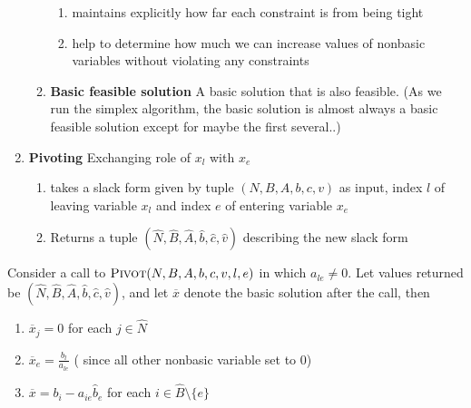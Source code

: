 \documentclass[11pt]{article}
\begin{document}
\begin{defn*}
\begin{enumerate}
\begin{enumerate}
            \begin{enumerate}
                \item maintains explicitly how far each constraint is from being tight 
                \item help to determine how much we can increase values of nonbasic variables without violating any constraints
            \end{enumerate}
            \item \textbf{Basic feasible solution} A basic solution that is also feasible. (As we run the simplex algorithm, the basic solution is almost always a basic feasible solution except for maybe the first several..)
        \end{enumerate}
        \item \textbf{Pivoting} Exchanging role of $x_l$ with $x_e$
        \begin{enumerate}
            \item takes a slack form given by tuple $(N,B, A, b,c ,v)$ as input, index $l$ of leaving variable $x_l$ and index $e$ of entering variable $x_e$
            \item Returns a tuple $(\hat{N}, \hat{B}, \hat{A}, \hat{b}, \hat{c}, \hat{v})$ describing the new slack form 
        \end{enumerate}
    \end{enumerate}
\end{defn*}


\begin{lemma*}
    Consider a call to $\textsc{Pivot}(N, B, A, b, c, v, l, e)$ in which $a_{le}\neq 0$. Let values returned be $(\hat{N}, \hat{B}, \hat{A}, \hat{b}, \hat{c}, \hat{v})$, and let $\overline{x}$ denote the basic solution after the call, then 
    \begin{enumerate}
        \item $\overline{x}_j = 0$ for each $j\in \hat{N}$
        \item $\overline{x}_e = \frac{b_l}{a_{le}}$ ( since all other nonbasic variable set to 0)
        \item $\overline{x} = b_i - a_{ie} \hat{b}_e$ for each $i\in \hat{B} \setminus \{ e\}$
    \end{enumerate}
\end{lemma*}
\end{document}
